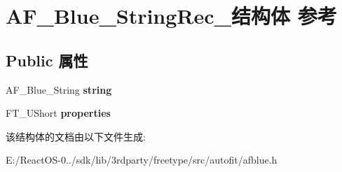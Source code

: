 \hypertarget{struct_a_f___blue___string_rec__}{}\section{A\+F\+\_\+\+Blue\+\_\+\+String\+Rec\+\_\+结构体 参考}
\label{struct_a_f___blue___string_rec__}
\subsection*{Public 属性}
\begin{DoxyCompactItemize}
\item 
\mbox{\label{struct_a_f___blue___string_rec___a97e07eb3c137d3e18a79f0c8557040f2}} 
A\+F\+\_\+\+Blue\+\_\+\+String {\bfseries string}
\item 
\mbox{\label{struct_a_f___blue___string_rec___aab7662c2a80a439ef052a7a71c4d9e3f}} 
F\+T\+\_\+\+U\+Short {\bfseries properties}
\end{DoxyCompactItemize}


该结构体的文档由以下文件生成\+:\begin{DoxyCompactItemize}
\item 
E\+:/\+React\+O\+S-\/0../sdk/lib/3rdparty/freetype/src/autofit/afblue.\+h\end{DoxyCompactItemize}

